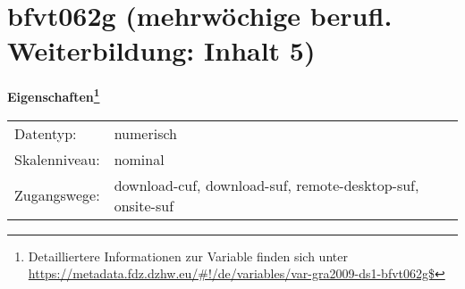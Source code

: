 
    \setcounter{footnote}{0}

    \vspace*{-1.8cm}
	\section{bfvt062g (mehrwöchige berufl. Weiterbildung: Inhalt 5)}
	\label{section:bfvt062g}



    \vspace*{0.5cm}
    \noindent\textbf{Eigenschaften\footnote{Detailliertere Informationen zur Variable finden sich unter
		\url{https://metadata.fdz.dzhw.eu/\#!/de/variables/var-gra2009-ds1-bfvt062g$}}}\\
	\begin{tabularx}{\hsize}{@{}lX}
	Datentyp: & numerisch \\
	Skalenniveau: & nominal \\
	Zugangswege: &
	  download-cuf, 
	  download-suf, 
	  remote-desktop-suf, 
	  onsite-suf
 \\
    \end{tabularx}



